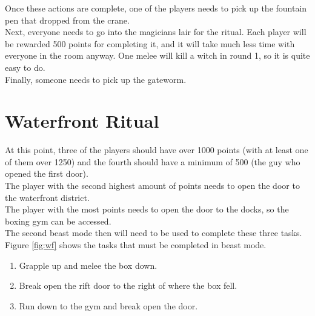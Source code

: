 \documentclass[11pt]{article} %
\begin{document}
	Once these actions are complete, one of the players needs to pick up the fountain pen that dropped from the crane. \\

	Next, everyone needs to go into the magicians lair for the ritual. Each player will be rewarded 500 points for completing it, and it will take much less time with everyone in the room anyway. One melee will kill a witch in round 1, so it is quite easy to do. \\

	Finally, someone needs to pick up the gateworm.

\newpage
\section{Waterfront Ritual}

	At this point, three of the players should have over 1000 points (with at least one of them over 1250) and the fourth should have a minimum of 500 (the guy who opened the first door). \\

	The player with the second highest amount of points needs to open the door to the waterfront district. \\

	The player with the most points needs to open the door to the docks, so the boxing gym can be accessed. \\

	The second beast mode then will need to be used to complete these three tasks. Figure \ref{fig:wf} shows the tasks that must be completed in beast mode.

	\begin{enumerate}
		\item Grapple up and melee the box down.
		\item Break open the rift door to the right of where the box fell.
		\item Run down to the gym and break open the door.
	\end{enumerate}
\end{document}
